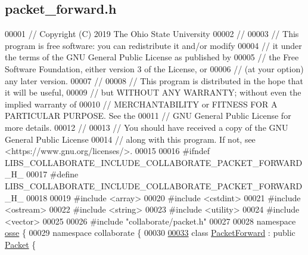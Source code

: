 \hypertarget{packet__forward_8h_source}{}\subsection{packet\+\_\+forward.\+h}
\label{packet__forward_8h_source}

\begin{DoxyCode}
00001 \textcolor{comment}{// Copyright (C) 2019 The Ohio State University}
00002 \textcolor{comment}{//}
00003 \textcolor{comment}{// This program is free software: you can redistribute it and/or modify}
00004 \textcolor{comment}{// it under the terms of the GNU General Public License as published by}
00005 \textcolor{comment}{// the Free Software Foundation, either version 3 of the License, or}
00006 \textcolor{comment}{// (at your option) any later version.}
00007 \textcolor{comment}{//}
00008 \textcolor{comment}{// This program is distributed in the hope that it will be useful,}
00009 \textcolor{comment}{// but WITHOUT ANY WARRANTY; without even the implied warranty of}
00010 \textcolor{comment}{// MERCHANTABILITY or FITNESS FOR A PARTICULAR PURPOSE.  See the}
00011 \textcolor{comment}{// GNU General Public License for more details.}
00012 \textcolor{comment}{//}
00013 \textcolor{comment}{// You should have received a copy of the GNU General Public License}
00014 \textcolor{comment}{// along with this program.  If not, see <https://www.gnu.org/licenses/>.}
00015 
00016 \textcolor{preprocessor}{#ifndef LIBS\_COLLABORATE\_INCLUDE\_COLLABORATE\_PACKET\_FORWARD\_H\_}
00017 \textcolor{preprocessor}{#define LIBS\_COLLABORATE\_INCLUDE\_COLLABORATE\_PACKET\_FORWARD\_H\_}
00018 
00019 \textcolor{preprocessor}{#include <array>}
00020 \textcolor{preprocessor}{#include <cstdint>}
00021 \textcolor{preprocessor}{#include <ostream>}
00022 \textcolor{preprocessor}{#include <string>}
00023 \textcolor{preprocessor}{#include <utility>}
00024 \textcolor{preprocessor}{#include <vector>}
00025 
00026 \textcolor{preprocessor}{#include "collaborate/packet.h"}
00027 
00028 \textcolor{keyword}{namespace }\hyperlink{namespaceosse}{osse} \{
00029 \textcolor{keyword}{namespace }collaborate \{
00030 
\hyperlink{classosse_1_1collaborate_1_1_packet_forward}{00033} \textcolor{keyword}{class }\hyperlink{classosse_1_1collaborate_1_1_packet_forward}{PacketForward} : \textcolor{keyword}{public} \hyperlink{classosse_1_1collaborate_1_1_packet}{Packet} \{

\end{DoxyCode}
